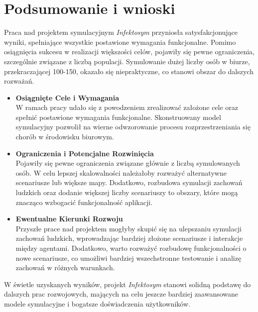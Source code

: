 \chapter{Podsumowanie i wnioski}

Praca nad projektem symulacyjnym \textit{Infektosym} przyniosła satysfakcjonujące wyniki, spełniające wszystkie postawione wymagania funkcjonalne. Pomimo osiągnięcia sukcesu w realizacji większości celów, pojawiły się pewne ograniczenia, szczególnie związane z liczbą populacji. Symulowanie dużej liczby osób w biurze, przekraczającej 100-150, okazało się niepraktyczne, co stanowi obszar do dalszych rozważań.

\begin{itemize}
	\item \textbf{Osiągnięte Cele i Wymagania} \\
	 W ramach pracy udało się z powodzeniem zrealizować założone cele oraz spełnić postawione wymagania funkcjonalne. Skonstruowany model symulacyjny pozwolił na wierne odwzorowanie procesu rozprzestrzeniania się chorób w środowisku biurowym.
	
	\item \textbf{Ograniczenia i Potencjalne Rozwinięcia} \\
	 Pojawiły się pewne ograniczenia związane głównie z liczbą symulowanych osób. W celu lepszej skalowalności należałoby rozważyć alternatywne scenariusze lub większe mapy. Dodatkowo, rozbudowa symulacji zachowań ludzkich oraz dodanie większej liczby scenariuszy to obszary, które mogą znacząco wzbogacić funkcjonalność aplikacji.
	
	\item \textbf{Ewentualne Kierunki Rozwoju} \\
	 Przyszłe prace nad projektem mogłyby skupić się na ulepszaniu symulacji zachowań ludzkich, wprowadzając bardziej złożone scenariusze i interakcje między agentami. Dodatkowo, warto rozważyć rozbudowę funkcjonalności o nowe scenariusze, co umożliwi bardziej wszechstronne testowanie i analizę zachowań w różnych warunkach.
\end{itemize}

W świetle uzyskanych wyników, projekt \textit{Infektosym} stanowi solidną podstawę do dalszych prac rozwojowych, mających na celu jeszcze bardziej zaawansowane modele symulacyjne i bogatsze doświadczenia użytkowników. 
